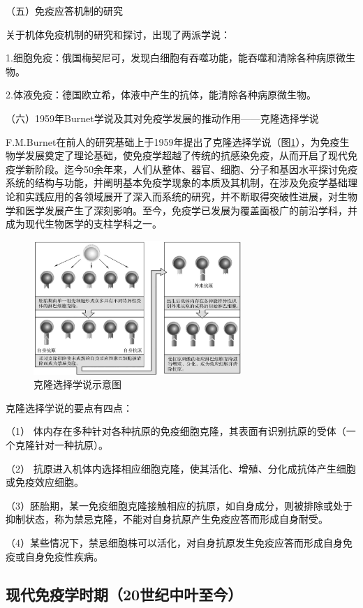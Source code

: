 （五）免疫应答机制的研究

关于机体免疫机制的研究和探讨，出现了两派学说：

1.细胞免疫：俄国梅契尼可，发现白细胞有吞噬功能，能吞噬和清除各种病原微生物。

2.体液免疫：德国欧立希，体液中产生的抗体，能清除各种病原微生物。

（六）1959年Burnet学说及其对免疫学发展的推动作用------克隆选择学说

F.M.Burnet在前人的研究基础上于1959年提出了克隆选择学说（图\ref{fig1-10}），为免疫生物学发展奠定了理论基础，使免疫学超越了传统的抗感染免疫，从而开启了现代免疫学新阶段。迄今50余年来，人们从整体、器官、细胞、分子和基因水平探讨免疫系统的结构与功能，并阐明基本免疫学现象的本质及其机制，在涉及免疫学基础理论和实践应用的各领域展开了深入而系统的研究，并不断取得突破性进展，对生物学和医学发展产生了深刻影响。至今，免疫学已发展为覆盖面极广的前沿学科，并成为现代生物医学的支柱学科之一。

\begin{figure}[!htbp]
 \centering
 \includegraphics[width=0.7\textwidth]{./images/Image00017.jpg}
 \caption{克隆选择学说示意图}
 \label{fig1-10}
  \end{figure} 

克隆选择学说的要点有四点：

（1）
体内存在多种针对各种抗原的免疫细胞克隆，其表面有识别抗原的受体（一个克隆针对一种抗原）。

（2）
抗原进入机体内选择相应细胞克隆，使其活化、增殖、分化成抗体产生细胞或免疫效应细胞。

（3）胚胎期，某一免疫细胞克隆接触相应的抗原，如自身成分，则被排除或处于抑制状态，称为禁忌克隆，不能对自身抗原产生免疫应答而形成自身耐受。

（4）某些情况下，禁忌细胞株可以活化，对自身抗原发生免疫应答而形成自身免疫或自身免疫性疾病。


\subsection{现代免疫学时期（20世纪中叶至今）}


